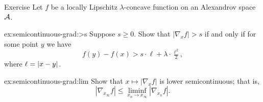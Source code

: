 \begin{thm}[!]{Exercise}\label{ex:semicontinuous-grad}
Let $f$ be a locally Lipschitz $\lambda$-concave function on an Alexandrov space $\mathcal{A}$.

\begin{subthm}{ex:semicontinuous-grad:>s}
Suppose $s\ge 0$.
Show that $|\nabla_xf|> s$ if and only if for some point $y$ we have
\[f(y)-f(x)>s\cdot \ell+\lambda\cdot \tfrac{\ell^2}2,\]
where $\ell=\dist{x}{y}{}$.
\end{subthm}

\begin{subthm}{ex:semicontinuous-grad:lim} Show that $x\mapsto|\nabla_xf|$ is lower semicontinuous;
that is,
\[|\nabla_{x_\infty}f|\le \liminf_{x_n\to x_\infty} |\nabla_{x_n}f|.\]

\end{subthm}

\end{thm}
